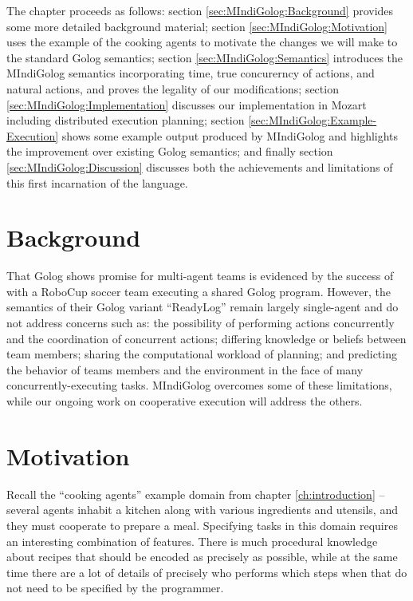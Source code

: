 The chapter proceeds as follows: section \ref{sec:MIndiGolog:Background}
provides some more detailed background material; section \ref{sec:MIndiGolog:Motivation}
uses the example of the cooking agents to motivate the changes we
will make to the standard Golog semantics; section \ref{sec:MIndiGolog:Semantics}
introduces the MIndiGolog semantics incorporating time, true concurerncy
of actions, and natural actions, and proves the legality of our modifications;
section \ref{sec:MIndiGolog:Implementation} discusses our implementation
in Mozart including distributed execution planning; section \ref{sec:MIndiGolog:Example-Execution}
shows some example output produced by MIndiGolog and highlights the
improvement over existing Golog semantics; and finally section \ref{sec:MIndiGolog:Discussion}
discusses both the achievements and limitations of this first incarnation
of the language.


\section{Background\label{sec:MIndiGolog:Background}}

That Golog shows promise for multi-agent teams is evidenced by the
success of \citet{Ferrein2005readylog} with a RoboCup soccer team
executing a shared Golog program. However, the semantics of their
Golog variant {}``ReadyLog'' remain largely single-agent and do
not address concerns such as: the possibility of performing actions
concurrently and the coordination of concurrent actions; differing
knowledge or beliefs between team members; sharing the computational
workload of planning; and predicting the behavior of teams members
and the environment in the face of many concurrently-executing tasks.
MIndiGolog overcomes some of these limitations, while our ongoing
work on cooperative execution will address the others.


\section{Motivation\label{sec:MIndiGolog:Motivation}}

Recall the {}``cooking agents'' example domain from chapter \ref{ch:introduction}
-- several agents inhabit a kitchen along with various ingredients
and utensils, and they must cooperate to prepare a meal. Specifying
tasks in this domain requires an interesting combination of features.
There is much procedural knowledge about recipes that should be encoded
as precisely as possible, while at the same time there are a lot of
details of precisely who performs which steps when that do not need
to be specified by the programmer.


